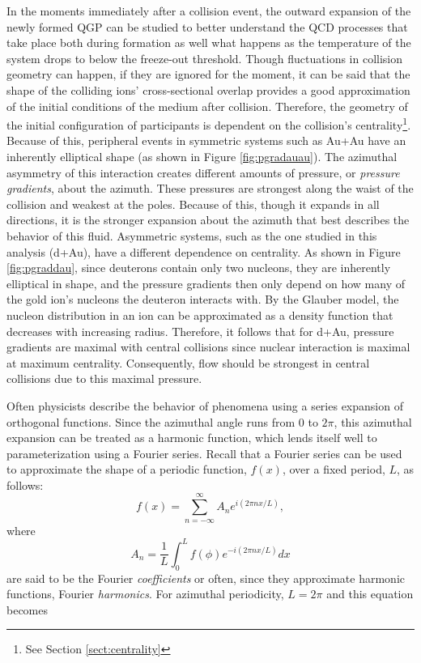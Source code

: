 \begin{figure}[p]
  \label{fig:pressuregradients}
\end{figure}


In the moments immediately after a collision event, the outward expansion of the newly formed QGP can be studied to better understand the QCD processes that take place both during formation as well what happens as the temperature of the system drops to below the freeze-out threshold. Though fluctuations in collision geometry can happen, if they are ignored for the moment, it can be said that the shape of the colliding ions' cross-sectional overlap provides a good approximation of the initial conditions of the medium after collision. Therefore, the geometry of the initial configuration of participants is dependent on the collision's centrality\footnote{See Section \ref{sect:centrality}}. Because of this, peripheral events in symmetric systems such as Au+Au have an inherently elliptical shape (as shown in Figure \ref{fig:pgradauau}). The azimuthal asymmetry of this interaction creates different amounts of pressure, or \textit{pressure gradients}, about the azimuth. These pressures are strongest along the waist of the collision and weakest at the poles. Because of this, though it expands in all directions, it is the stronger expansion about the azimuth that best describes the behavior of this fluid. Asymmetric systems, such as the one studied in this analysis (d+Au), have a different dependence on centrality. As shown in Figure \ref{fig:pgraddau}, since deuterons contain only two nucleons, they are inherently elliptical in shape, and the pressure gradients then only depend on how many of the gold ion's nucleons the deuteron interacts with. By the Glauber model, the nucleon distribution in an ion can be approximated as a density function that decreases with increasing radius. Therefore, it follows that for d+Au, pressure gradients are maximal with central collisions since nuclear interaction is maximal at maximum centrality. Consequently, flow should be strongest in central collisions due to this maximal pressure.  

Often physicists describe the behavior of phenomena using a series expansion of orthogonal functions. Since the azimuthal angle runs from $0$ to $2 \pi$, this azimuthal expansion can be treated as a harmonic function, which lends itself well to parameterization using a Fourier series. Recall that a Fourier series can be used to approximate the shape of a periodic function, $f(x)$, over a fixed period, $L$, as follows:
\begin{equation}
f(x) = \sum^{\infty}_{n=-\infty} A_{n} e^{i(2 \pi n x / L)},
\end{equation}
where
\begin{equation}
A_{n} = \frac{1}{L} \int^{L}_{0} f(\phi) e^{-i(2 \pi n x / L)} dx
\end{equation}
are said to be the Fourier \textit{coefficients} or often, since they approximate harmonic functions, Fourier \textit{harmonics}. For azimuthal periodicity, $L=2\pi$ and this equation becomes

